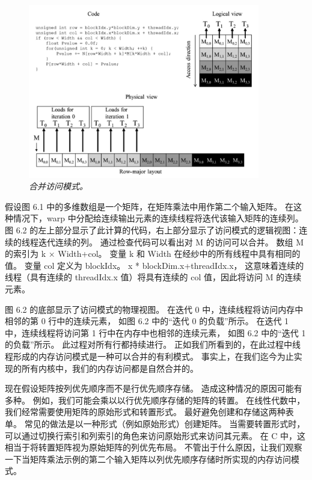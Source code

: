 \begin{figure}[H]
	\centering
	\includegraphics[width=0.9\textwidth]{figs/F6.2.png}
	\caption{\textit{合并访问模式。}}
\end{figure}

假设图 6.1 中的多维数组是一个矩阵，在矩阵乘法中用作第二个输入矩阵。 
在这种情况下，warp 中分配给连续输出元素的连续线程将迭代该输入矩阵的连续列。 
图 6.2 的左上部分显示了此计算的代码，右上部分显示了访问模式的逻辑视图：连续的线程迭代连续的列。 
通过检查代码可以看出对 M 的访问可以合并。 数组 M 的索引为 k × Width+col。 
变量 k 和 Width 在经纱中的所有线程中具有相同的值。 变量 col 定义为 blockIdx。 x * blockDim.x+threadIdx.x，
这意味着连续的线程（具有连续的 threadIdx.x 值）将具有连续的 col 值，因此将访问 M 的连续元素。

图 6.2 的底部显示了访问模式的物理视图。 在迭代 0 中，连续线程将访问内存中相邻的第 0 行中的连续元素，
如图 6.2 中的“迭代 0 的负载”所示。 在迭代 1 中，连续线程将访问第 1 行中在内存中也相邻的连续元素，
如图 6.2 中的“迭代 1 的负载”所示。 此过程对所有行都持续进行。 
正如我们所看到的，在此过程中线程形成的内存访问模式是一种可以合并的有利模式。 
事实上，在我们迄今为止实现的所有内核中，我们的内存访问都是自然合并的。

现在假设矩阵按列优先顺序而不是行优先顺序存储。 造成这种情况的原因可能有多种。 
例如，我们可能会乘以以行优先顺序存储的矩阵的转置。 在线性代数中，我们经常需要使用矩阵的原始形式和转置形式。 
最好避免创建和存储这两种表单。 常见的做法是以一种形式（例如原始形式）创建矩阵。 
当需要转置形式时，可以通过切换行索引和列索引的角色来访问原始形式来访问其元素。 
在 C 中，这相当于将转置矩阵视为原始矩阵的列优先布局。 
不管出于什么原因，让我们观察一下当矩阵乘法示例的第二个输入矩阵以列优先顺序存储时所实现的内存访问模式。

